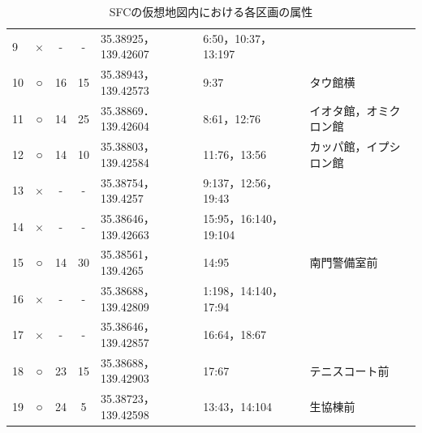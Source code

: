 \begin{table}[htbp]
{\begin{tabular}{lccclll}
			\multicolumn{1}{l|}{9}        & ×        & -                                & -                             & 35.38925，139.42607        & 6:50，10:37，13:197                 &                                    \\
			\multicolumn{1}{l|}{10}       & ○       & 16                               & 15                            & 35.38943，139.42573        & 9:37                                  & タウ館横                       \\
			\multicolumn{1}{l|}{11}       & ○       & 14                               & 25                            & 35.38869．139.42604        & 8:61，12:76                          & イオタ館，オミクロン館  \\
			\multicolumn{1}{l|}{12}       & ○       & 14                               & 10                            & 35.38803，139.42584        & 11:76，13:56                         & カッパ館，イプシロン館  \\
			\multicolumn{1}{l|}{13}       & ×        & -                                & -                             & 35.38754，139.4257         & 9:137，12:56，19:43                 &                                    \\
			\multicolumn{1}{l|}{14}       & ×        & -                                & -                             & 35.38646，139.42663        & 15:95，16:140，19:104               &                                    \\
			\multicolumn{1}{l|}{15}       & ○       & 14                               & 30                            & 35.38561，139.4265         & 14:95                                 & 南門警備室前                 \\
			\multicolumn{1}{l|}{16}       & ×        & -                                & -                             & 35.38688，139.42809        & 1:198，14:140，17:94                &                                    \\
			\multicolumn{1}{l|}{17}       & ×        & -                                & -                             & 35.38646，139.42857        & 16:64，18:67                         &                                    \\
			\multicolumn{1}{l|}{18}       & ○       & 23                               & 15                            & 35.38688，139.42903        & 17:67                                 & テニスコート前              \\
			\multicolumn{1}{l|}{19}       & ○       & 24                               & 5                             & 35.38723，139.42598        & 13:43，14:104                        & 生協棟前                       \\ \hline
		\end{tabular}%
	}
	\caption{SFCの仮想地図内における各区画の属性}
	\label{sfc-nodes}
\end{table}


